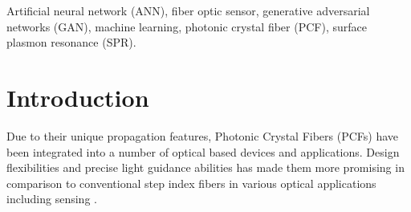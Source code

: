 \documentclass[journal]{IEEEtran}
\begin{document}
\begin{IEEEkeywords}
	Artificial neural network (ANN), fiber optic sensor, generative adversarial networks (GAN), machine learning, photonic crystal fiber (PCF), surface plasmon resonance (SPR).
\end{IEEEkeywords}






%
\IEEEpeerreviewmaketitle



\section{Introduction}
Due to their unique propagation features, Photonic Crystal Fibers (PCFs) have been integrated into a number of optical based devices and applications. Design flexibilities and precise light guidance abilities has made them more promising in comparison to conventional step index fibers in various optical applications including sensing \cite{wang2011selectively}. 
\end{document}
